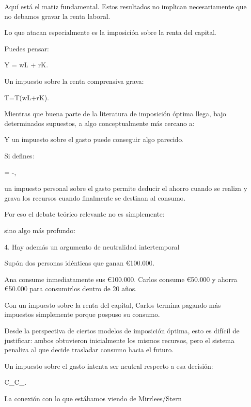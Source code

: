 \documentclass[10pt,a4paper]{article}
\begin{document}
Aquí está el matiz fundamental. Estos resultados no implican necesariamente que no debamos gravar la renta laboral.

Lo que atacan especialmente es la imposición sobre la renta del capital.

Puedes pensar:

Y = wL + rK.

Un impuesto sobre la renta comprensiva grava:

T=T(wL+rK).

Mientras que buena parte de la literatura de imposición óptima llega, bajo determinados supuestos, a algo conceptualmente más cercano a:


Y un impuesto sobre el gasto puede conseguir algo parecido.

Si defines:

= -,

un impuesto personal sobre el gasto permite deducir el ahorro cuando se realiza y grava los recursos cuando finalmente se destinan al consumo.

Por eso el debate teórico relevante no es simplemente:


sino algo más profundo:


4. Hay además un argumento de neutralidad intertemporal

Supón dos personas idénticas que ganan €100.000.

Ana consume inmediatamente sus €100.000. Carlos consume €50.000 y ahorra €50.000 para consumirlos dentro de 20 años.

Con un impuesto sobre la renta del capital, Carlos termina pagando más impuestos simplemente porque pospuso su consumo.

Desde la perspectiva de ciertos modelos de imposición óptima, esto es difícil de justificar: ambos obtuvieron inicialmente los mismos recursos, pero el sistema penaliza al que decide trasladar consumo hacia el futuro.

Un impuesto sobre el gasto intenta ser neutral respecto a esa decisión:

C_{}\quad\leftrightarrow\quad C_{}.

La conexión con lo que estábamos viendo de Mirrlees/Stern
\end{document}
